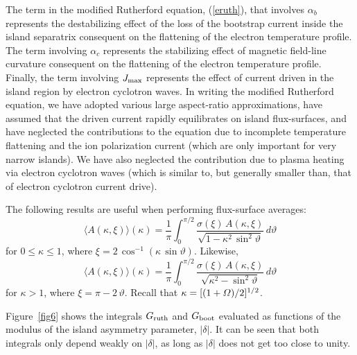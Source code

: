 \documentclass[12pt,prb,aps]{revtex4-1}
\begin{document}
 The term in the modified Rutherford equation, (\ref{eruth}),  that involves $\alpha_b$  represents  the
 destabilizing effect of the loss of the bootstrap current inside the island separatrix consequent on the flattening of the electron temperature profile. \cite{ntm2,car} The term involving $\alpha_c$ represents  the stabilizing effect of  magnetic field-line curvature  consequent on the flattening of the electron temperature profile.\cite{fitz,kot} Finally, the term involving $J_{\rm max}$ represents the effect of current driven in the island region by electron cyclotron waves.\cite{island} In writing the modified
 Rutherford equation, we have adopted various large aspect-ratio approximations,\cite{ggj1,fitz} have assumed that the driven current rapidly equilibrates on
 island flux-surfaces, 
and have  neglected the contributions to the equation due to incomplete temperature flattening and the ion polarization current (which are only important for
 very narrow islands). We  have also neglected the contribution due to
 plasma heating via electron cyclotron waves (which is similar to, but generally smaller than, that of electron cyclotron current drive).\cite{ntm4,island}
 
 The following results are useful when performing flux-surface averages:\,\cite{island}
\begin{equation}
\langle A(\kappa,\xi)\rangle(\kappa) = \frac{1}{\pi}\int_0^{\pi/2}\frac{\sigma(\xi)\,A(\kappa,\xi)}{\sqrt{1-\kappa^2\,\sin^2\vartheta}}\,d\vartheta
\end{equation}
for $0\leq \kappa\leq 1$, where $\xi=2\,\cos^{-1}(\kappa\,\sin\vartheta)$. Likewise, 
\begin{equation}
\langle A(\kappa,\xi)\rangle(\kappa) = \frac{1}{\pi}\int_0^{\pi/2}\frac{\sigma(\xi)\,A(\kappa,\xi)}{\sqrt{\kappa^2-\sin^2\vartheta}}\,d\vartheta
\end{equation}
for $\kappa>1$, where $\xi=\pi-2\,\vartheta$. Recall that $\kappa=[(1+{\mit\Omega})/2]^{1/2}$. 

Figure~\ref{fig6} shows the integrals $G_{\rm ruth}$ and $G_{\rm boot}$ evaluated as functions of the modulus of the island asymmetry
parameter, $|\delta|$. It can be seen that both integrals only depend weakly on $|\delta|$, as long as $|\delta|$ does not get too close to
unity.\cite{ece6,island}
 
\end{document}

